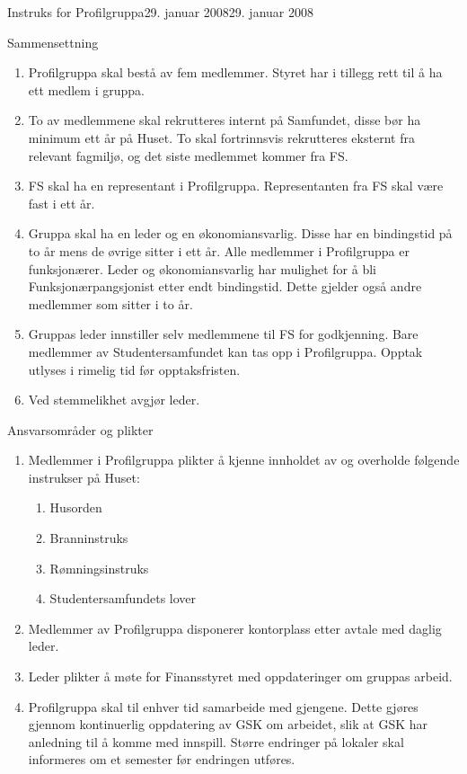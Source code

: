 \begin{instruks}{Instruks for Profilgruppa}{29. januar 2008}{29. januar 2008}
    \begin{instruksledd}{Sammensettning}
        \begin{enumerate}
            \item Profilgruppa skal bestå av fem medlemmer. Styret har i tillegg rett til å ha ett medlem i gruppa.
            \item To av medlemmene skal rekrutteres internt på Samfundet, disse bør ha minimum ett år på Huset. To skal
fortrinnsvis rekrutteres eksternt fra relevant fagmiljø, og det siste medlemmet kommer fra FS.
            \item  FS skal ha en representant i Profilgruppa. Representanten fra FS skal være fast i ett år.
            \item Gruppa skal ha en leder og en økonomiansvarlig. Disse har en bindingstid på to år mens de øvrige sitter i ett
år. Alle medlemmer i Profilgruppa er funksjonærer. Leder og økonomiansvarlig har mulighet for å bli
Funksjonærpangsjonist etter endt bindingstid. Dette gjelder også andre medlemmer som sitter i to år.
            \item Gruppas leder innstiller selv medlemmene til FS for godkjenning. Bare medlemmer av Studentersamfundet
kan tas opp i Profilgruppa. Opptak utlyses i rimelig tid før opptaksfristen.
            \item Ved stemmelikhet avgjør leder.
        \end{enumerate}
    \end{instruksledd}

    \begin{instruksledd}{Ansvarsområder og plikter}
        \begin{enumerate}
            \item Medlemmer i Profilgruppa plikter å kjenne innholdet av og overholde følgende instrukser på Huset:
                \begin{enumerate}
                    \item Husorden
                    \item Branninstruks
                    \item Rømningsinstruks
                    \item Studentersamfundets lover
                \end{enumerate}
            \item Medlemmer av Profilgruppa disponerer kontorplass etter avtale med daglig leder.
            \item Leder plikter å møte for Finansstyret med oppdateringer om gruppas arbeid.
            \item Profilgruppa skal til enhver tid samarbeide med gjengene. Dette gjøres gjennom kontinuerlig oppdatering av
GSK om arbeidet, slik at GSK har anledning til å komme med innspill. Større endringer på lokaler skal
informeres om et semester før endringen utføres.
        \end{enumerate}
    \end{instruksledd}


\end{instruks}
